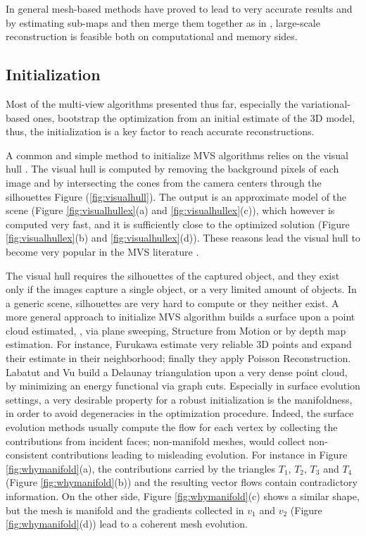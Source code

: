 In general mesh-based methods have proved to lead to very accurate results and  by estimating  sub-maps and then merge them together as in \cite{vu2011large},  large-scale reconstruction is feasible both on computational and memory sides.


\subsection{Initialization}
Most of the  multi-view algorithms presented thus far, especially the variational-based ones, bootstrap the optimization from an initial estimate of the 3D model, thus, the initialization is a key factor to reach accurate reconstructions.

A common and simple method to initialize MVS algorithms relies on the visual hull \cite{laurentini1994visual}. 
The visual hull is computed by removing the background pixels of each image and by intersecting the cones from the camera centers through the silhouettes Figure (\ref{fig:visualhull}). 
The output is an approximate model of the scene (Figure \ref{fig:visualhullex}(a) and \ref{fig:visualhullex}(c)), which however is computed very fast, and it is sufficiently close to the optimized solution (Figure \ref{fig:visualhullex}(b) and \ref{fig:visualhullex}(d)). These reasons lead the visual hull to become very popular in the MVS literature \cite{jin2002variational,soatto2003tales,zaharescu2007transformesh,yoon2010joint}.

The visual hull requires the silhouettes of the captured object, and they exist only if the images capture a single object, or a very limited amount of objects.
In a generic scene, silhouettes are very hard to compute or they neither exist.
A more general approach to initialize MVS algorithm builds a surface upon a point cloud estimated, \eg, via plane sweeping, Structure from Motion or by depth map estimation.
For instance, Furukawa \etal \cite{fu10} estimate very reliable 3D points and expand their estimate in their neighborhood; finally they apply Poisson Reconstruction. 
Labatut \etal \cite{labatut2007efficient} and Vu \etal \cite{vu_et_al_2012} build a Delaunay triangulation upon a very dense point cloud, by minimizing an energy functional via graph cuts.
Especially in surface evolution settings, a very desirable property for a robust initialization is the manifoldness, in order to avoid degeneracies in the optimization procedure. 
Indeed, the surface evolution methods usually compute the flow for each vertex by collecting the contributions from incident faces; non-manifold meshes, would collect non-consistent contributions leading to misleading evolution.
For instance in Figure \ref{fig:whymanifold}(a), the contributions  carried by the triangles $T_1$, $T_2$, $T_3$ and $T_4$ (Figure \ref{fig:whymanifold}(b)) and the resulting vector flows contain contradictory information.
On the other side, Figure \ref{fig:whymanifold}(c) shows a similar shape, but the mesh is manifold and the gradients collected in $v_1$ and $v_2$ (Figure \ref{fig:whymanifold}(d)) lead to a coherent mesh evolution.




